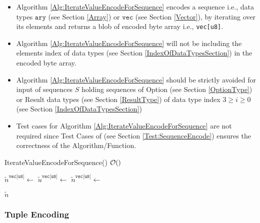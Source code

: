 \documentclass[../alan-handbook.tex]{subfiles}
\begin{document}
\begin{itemize}
    \item Algorithm \ref{Alg:IterateValueEncodeForSequence} encodes a sequence i.e., data types $\texttt{ary}$ (see Section \ref{Array}) or $\texttt{vec}$ (see Section \ref{Vector}), by iterating over its elements and returns a blob of encoded byte array i.e., \texttt{vec[u8]}. 
    \item Algorithm \ref{Alg:IterateValueEncodeForSequence} will not be including the elements index of data types (see Section \ref{IndexOfDataTypesSection}) in the encoded byte array.
    \item Algorithm \ref{Alg:IterateValueEncodeForSequence} should be strictly avoided for input of sequences $S$ holding sequences of Option (see Section \ref{OptionType}) or Result data types (see Section \ref{ResultType}) of data type index $3 \geq i \geq 0$ (see Section \ref{IndexOfDataTypesSection})
    \item Test cases for Algorithm \ref{Alg:IterateValueEncodeForSequence} are not required since Test Cases of  (see Section \ref{Test:SequenceEncode}) ensures the correctness of the  Algorithm/Function. 
\end{itemize}

\begin{algorithm}
\caption{IterateValueEncodeForSequence() \hfill $\mathcal{O}()$ }
\label{Alg:IterateValueEncodeForSequence}
\begin{algorithmic}
     \Comment{\ref{SetNotations}}
            \State $\tilde{n}^{\texttt{vec[u8]}} \gets$  \Comment{\ref{ValueEncode}}
        \Else 
            \State $\tilde{u}^{\texttt{vec[u8]}} \gets$  \Comment{\ref{ValueEncode}}
            \State $\tilde{n}^{\texttt{vec[u8]}} \gets$  \Comment{\ref{ConcatByteArrays}}
        \EndIf
    \EndFor

    \Return $\tilde{n}$
\EndFunction
\end{algorithmic}
\end{algorithm}

\subsubsection{Tuple Encoding} 
\label{TupleEncoding}
\end{document}
